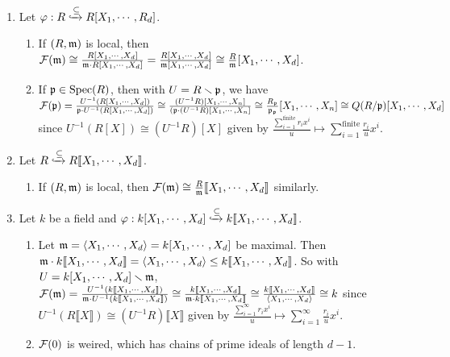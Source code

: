 \begin{example}\label{3.27}
    \begin{enumerate}
        \item Let $\varphi: R \xhookrightarrow \subseteq R[X_1,\cdots,R_d]$.
            \begin{enumerate}
                \item If $(R,\mathfrak{m})$ is local, then $\mathcal{F}(\mathfrak{m}) \cong \frac{R[X_1,\cdots,X_d]}{\mathfrak{m} \cdot R[X_1,\cdots,X_d]} = \frac{R[X_1,\cdots,X_d]}{\mathfrak{m} [X_1,\cdots,X_d]} \cong \frac{R}{\mathfrak{m}}[X_1,\cdots,X_d]$.
                \item If $\mathfrak{p} \in \operatorname{Spec}(R)$, then with $U = R \smallsetminus \mathfrak{p}$, we have $\mathcal{F}(\mathfrak{p}) = \frac{U^{-1}(R[X_1,\cdots,X_d])}{\mathfrak{p} \cdot U^{-1}(R[X_1,\cdots,X_d])} \cong \frac{(U^{-1}R)[X_1,\cdots,X_n]}{(\mathfrak{p} \cdot (U^{-1}R)[X_1,\cdots,X_n]} \cong \frac{R_{\mathfrak{p}}}{\mathfrak{p}_{\mathfrak{p}}}[X_1,\cdots,X_n] \cong Q(R/\mathfrak{p})[X_1,\cdots,X_d]$ since $U^{-1}(R[X]) \cong (U^{-1}R)[X]$ given by $\frac{\sum_{i=1}^{\text{finite}}r_ix^{i}}{u} \mapsto \sum_{i=1}^{\text{finite}}\frac{r_i}{u}x^{i}$.
            \end{enumerate}
        \item 
            Let $R \xhookrightarrow{\subseteq} R\llbracket X_1,\cdots,X_d \rrbracket$.
            \begin{enumerate}
                \item If $(R,\mathfrak{m})$ is local, then $\mathcal{F}(\mathfrak{m}) \cong \frac{R}{\mathfrak{m}}\llbracket X_1,\cdots,X_d \rrbracket$ similarly.
            \end{enumerate}
        \item
            Let $k$ be a field and $\varphi: k[X_1,\cdots,X_d] \xhookrightarrow{\subseteq} k\llbracket X_1,\cdots,X_d \rrbracket$.
            \begin{enumerate}
                \item Let $\mathfrak{m} = \langle X_1,\cdots,X_d \rangle = k[X_1,\cdots,X_d]$ be maximal. Then $\mathfrak{m} \cdot k\llbracket X_1,\cdots,X_d \rrbracket = \langle X_1,\cdots,X_d \rangle \leq k\llbracket X_1,\cdots,X_d \rrbracket$. So with $U = k[X_1,\cdots,X_d] \smallsetminus \mathfrak{m}$, $\mathcal{F}(\mathfrak{m}) = \frac{U^{-1}(k\llbracket X_1,\cdots,X_d \rrbracket)}{\mathfrak{m} \cdot U^{-1}(k\llbracket X_1,\cdots,X_d \rrbracket)} \cong \frac{k\llbracket X_1,\cdots,X_d \rrbracket}{\mathfrak{m} \cdot k\llbracket X_1,\cdots,X_d \rrbracket} \cong \frac{k\llbracket X_1,\cdots,X_d \rrbracket}{\langle X_1,\cdots,X_d \rangle} \cong k$ since $U^{-1}(R\llbracket X \rrbracket) \cong (U^{-1}R)\llbracket X \rrbracket $ given by $\frac{\sum_{i=1}^{\infty}r_ix^{i}}{u} \mapsto \sum_{i=1}^{\infty}\frac{r_i}{u}x^{i}$.
                \item $\mathcal{F}(0)$ is weired, which has chains of prime ideals of length $d-1$.
            \end{enumerate}
    \end{enumerate}
\end{example}
